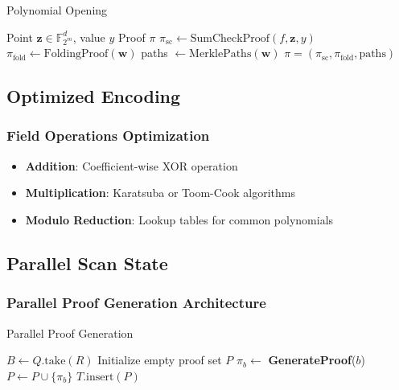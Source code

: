 \documentclass{article}
\theoremstyle{plain}
\theoremstyle{definition}
\theoremstyle{remark}
\theoremstyle{problem}
\begin{document}
\begin{algorithm}
\caption{Polynomial Opening}
\begin{algorithmic}[1]
\Require Point $\mathbf{z} \in \mathbb{F}_{2^m}^d$, value $y$
\Ensure Proof $\pi$
\State $\pi_{\text{sc}} \gets \text{SumCheckProof}(f, \mathbf{z}, y)$
\State $\pi_{\text{fold}} \gets \text{FoldingProof}(\mathbf{w})$
\State paths $\gets \text{MerklePaths}(\mathbf{w})$
\State \Return $\pi = (\pi_{\text{sc}}, \pi_{\text{fold}}, \text{paths})$
\end{algorithmic}
\end{algorithm}

\subsection{Optimized Encoding}

\subsubsection{Field Operations Optimization}

\begin{itemize}
    \item \textbf{Addition}: Coefficient-wise XOR operation
    \item \textbf{Multiplication}: Karatsuba or Toom-Cook algorithms
    \item \textbf{Modulo Reduction}: Lookup tables for common polynomials
\end{itemize}

\subsection{Parallel Scan State}

\subsubsection{Parallel Proof Generation Architecture}

\begin{algorithm}
\caption{Parallel Proof Generation}
\begin{algorithmic}[1]
    \State $B \gets Q.\text{take}(R)$
    \State Initialize empty proof set $P$
        \State $\pi_b \gets$ \textbf{GenerateProof}($b$)
        \State $P \gets P \cup \{\pi_b\}$
    \EndParFor
    \State $T.\text{insert}(P)$
\EndProcedure
\end{algorithmic}
\end{algorithm}
\end{document}
